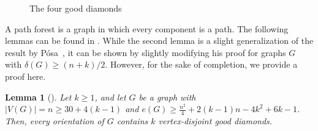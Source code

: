 \documentclass[11pt]{article}
\newtheorem{lemma}[theorem]{Lemma}
\newcommand{\QGr}[1]{{#1}}
\newcommand{\QGn}[1]{{#1}}
\newcommand{\2}{\vspace{0.2cm}}
\begin{document}
\begin{figure}[htp]
\begin{minipage}[t]{0.19\linewidth}
    \end{minipage}
    \begin{minipage}[t]{0.19\linewidth}
        \vspace{0pt}
        \centering
    \end{minipage}



    \caption{The four good diamonds}
    \label{fig1}
\end{figure}
    	
    \QGr{A path forest is a graph in which every component is a path.} The following lemmas can be found in \cite{GKM23}. While the second lemma is a slight generalization of the result by P\'osa~\cite{P63}, it can be shown by slightly modifying his proof for graphs \QGn{$G$} with $\delta(G)\geq (n+k)/2$. However, for the sake of completion, we provide a proof here.
	
	\begin{lemma}[\cite{GKM23}]\label{lem:2}
		Let $k\geq 1$, and let $G$ be a graph with $|V(G)|=n\geq 30+4(k-1)$ and $e(G)\geq \frac{n^2}{4} + 2(k-1)n - 4k^2 +6k-1$. Then, every orientation of $G$ contains $k$ vertex-disjoint good diamonds.
	\end{lemma}
\end{document}
